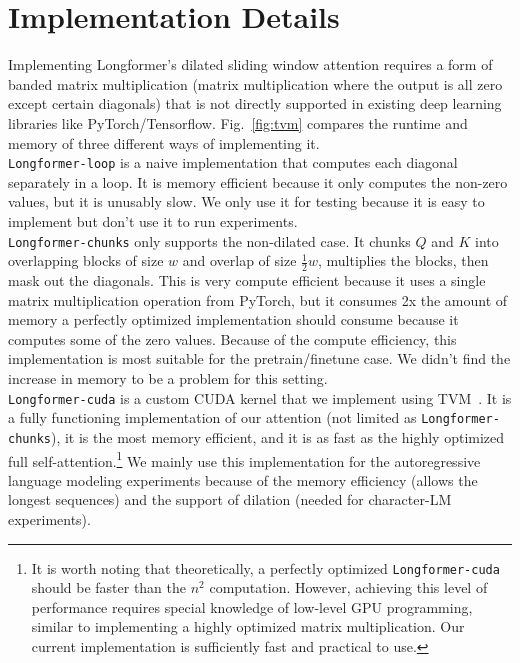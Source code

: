 \documentclass[11pt,a4paper]{article}
\newcommand{\model}{Longformer\xspace}
\begin{document}


\clearpage

\appendix
\section{Implementation Details}
\label{sec:tvm_details}

Implementing \model's dilated sliding window attention requires a form
of banded matrix multiplication (matrix multiplication where the output
is all zero except certain diagonals) that is not directly supported in 
existing deep learning libraries like PyTorch/Tensorflow. 
Fig.~\ref{fig:tvm} compares the runtime and memory of three different ways of implementing
it. \\
\texttt{\model-loop} is a naive implementation that computes each diagonal separately in a loop. 
It is memory efficient because it only computes the non-zero values, but 
it is unusably slow. We only use it for testing because it is easy to implement but don't use 
it to run experiments. \\
\texttt{\model-chunks} only supports the non-dilated case. It chunks $Q$ and $K$ into 
overlapping blocks of size $w$ and overlap of size $\frac{1}{2}w$, multiplies the blocks, 
then mask out the diagonals. This is very compute efficient because it uses
a single matrix multiplication operation from PyTorch, but it consumes 2x the amount of memory
a perfectly optimized implementation should consume because it computes some of the zero values.
Because of the compute efficiency, this implementation is most suitable for the 
pretrain/finetune case. We didn't find the increase in memory to be a problem for this setting. \\
\texttt{\model-cuda} is a custom CUDA kernel that we implement using 
TVM~\cite{tvm}. It is a fully functioning implementation of our attention (not limited as \texttt{\model-chunks}), it is the most memory efficient, 
and it is as fast as the highly optimized full self-attention.\footnote{It is worth noting that theoretically, a perfectly optimized \texttt{\model-cuda} should be faster than the $n^2$ computation. 
However, achieving this level of performance requires special knowledge of low-level GPU programming, similar to implementing a highly optimized matrix multiplication. Our current implementation is sufficiently fast and practical to use.} We mainly use this implementation for the 
autoregressive language modeling experiments because of the memory efficiency (allows the longest 
sequences) and the support of dilation (needed for character-LM experiments).
\end{document}
